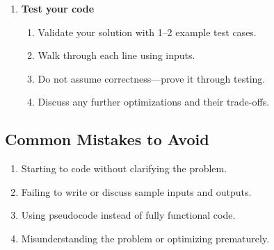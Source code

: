 \begin{summary}
\begin{enumerate}
        \item \textbf{Test your code}
        \begin{enumerate}
            \item Validate your solution with 1–2 example test cases.
            \item Walk through each line using inputs.
            \item Do not assume correctness—prove it through testing.
            \item Discuss any further optimizations and their trade-offs.
        \end{enumerate}
    \end{enumerate}
\end{summary}

\subsection{Common Mistakes to Avoid}
\begin{warning}
    \begin{enumerate}
        \item Starting to code without clarifying the problem.
        \item Failing to write or discuss sample inputs and outputs.
        \item Using pseudocode instead of fully functional code.
        \item Misunderstanding the problem or optimizing prematurely.
    \end{enumerate}
\end{warning}
\newpage


